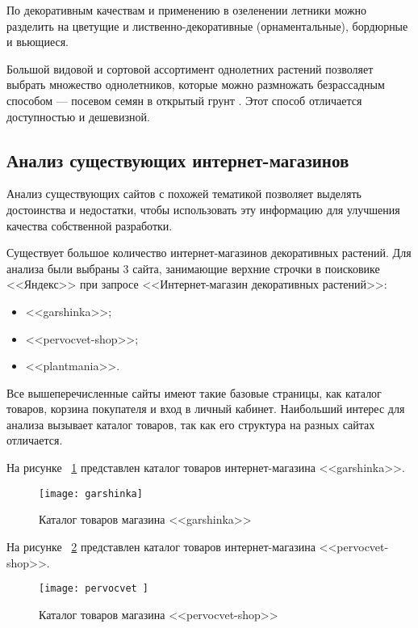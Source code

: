 По декоративным качествам и применению в озеленении летники можно разделить на цветущие и лиственно-декоративные (орнаментальные), бордюрные и вьющиеся.

Большой видовой и сортовой ассортимент однолетних растений позволяет выбрать множество однолетников, которые можно размножать безрассадным способом — посевом семян в открытый грунт \cite{aleksandrova}. Этот способ отличается доступностью и дешевизной.



\subsection{Анализ существующих интернет-магазинов}
\label{shopsAnalize}
Анализ существующих сайтов с похожей тематикой позволяет выделять достоинства и недостатки, чтобы использовать эту информацию для улучшения качества собственной разработки.

Существует большое количество интернет-магазинов декоративных растений. Для анализа были выбраны 3 сайта, занимающие верхние строчки в поисковике <<Яндекс>> при запросе <<Интернет-магазин декоративных растений>>:
\begin{itemize}
	\item <<garshinka>>;
	\item <<pervocvet-shop>>;
	\item <<plantmania>>.
\end{itemize}

Все вышеперечисленные сайты имеют такие базовые страницы, как каталог товаров, корзина покупателя и вход в личный кабинет. Наибольший интерес для анализа вызывает каталог товаров, так как  его структура на разных сайтах отличается.

На рисунке ~\ref{garshinka:image} представлен каталог товаров интернет-магазина <<garshinka>>.

\begin{figure}[h!]
	\texttt{[image: garshinka]}
	\caption{Каталог товаров магазина <<garshinka>>}
	\label{garshinka:image}
\end{figure}


На рисунке ~\ref{pervocvet:image} представлен каталог товаров интернет-магазина <<pervocvet-shop>>.

\begin{figure}[h!]
	\texttt{[image: pervocvet ]}
	\caption{Каталог товаров магазина <<pervocvet-shop>>}
	\label{pervocvet:image}
\end{figure}


